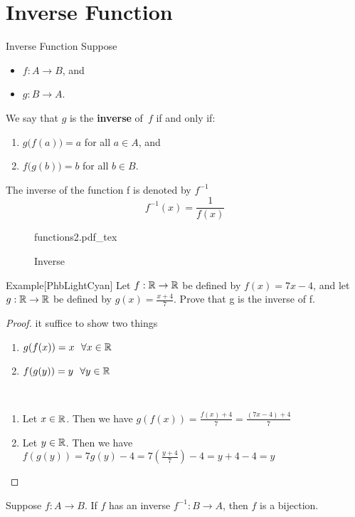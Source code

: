 \documentclass[../MATH-2000-Notes.tex]{subfiles}
\begin{document}
\section{Inverse Function}
\begin{Definition}
    {Inverse Function}
    Suppose
    \begin{itemize}
        \item $f \colon A \to B$,
              and
        \item $g \colon B \to A$.
    \end{itemize}
    We say that $g$ is the \textbf{inverse} of~$f$ if and only if:
    \begin{enumerate} \renewcommand{\theenumi}{\alph{enumi}}
        \item $g \bigl( f(a) \bigr) = a$ for all $a \in A$,
              and
        \item $f \bigl( g(b) \bigr) = b$ for all $b \in B$.
    \end{enumerate}

    The inverse of the function f is denoted by \(f^{-1}\)  \[f^{-1}(x) = \frac{1}{f(x)}\]
\end{Definition}
\begin{figure}[htbp]
    \centering
    {functions2.pdf_tex}
    \caption{Inverse}
    \label{fig:inverse}
\end{figure}
\newpage
\begin{commentbox}{Example}[{PhbLightCyan}]
    Let \(f: \mathbb{R} \rightarrow \mathbb{R}\) be defined by \(f(x) = 7x - 4\), and let \(g: \mathbb{R} \rightarrow \mathbb{R}\) be defined by \(g(x) = \frac{x + 4}{7}\). Prove that g is the inverse of f.
\end{commentbox}
\begin{proof}
    it suffice to show two things
    \begin{enumerate}
        \item \(g(f(x)) = x\ \ \forall x \in \mathbb{R}\)
        \item \(f(g(y)) = y\ \ \forall y \in \mathbb{R}\)
    \end{enumerate}
    ~\\
    \begin{enumerate}
        \item Let \(x \in \mathbb{R} \). Then we have \(g(f(x)) = \frac{f(x) + 4}{7} = \frac{(7x - 4) + 4 }{7}\)
        \item Let \(y \in \mathbb{R} \). Then we have \(f(g(y)) = 7g(y) - 4 = 7\left( \frac{y + 4}{7} \right) - 4 = y + 4 - 4 = y\)
    \end{enumerate}
\end{proof}
\begin{Theorem}
    {}\label{Inverse->Bijection}
    Suppose $f\colon A \to B$. If $f$ has an inverse $f^{-1} \colon B \to A$, then $f$ is a bijection.
\end{Theorem}
\end{document}
